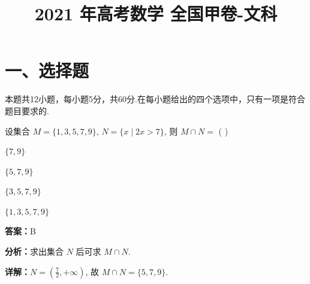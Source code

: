 ﻿\title{2021 年高考数学 全国甲卷-文科}
\date{}
\maketitle

\section*{一、选择题}
本题共12小题，每小题5分，共60分.在每小题给出的四个选项中，只有一项是符合题目要求的.

\begin{question}[points=5]
设集合 $M = \{1,3,5,7,9\}$, $N = \{x \mid 2x > 7\}$, 则 $M \cap N =$ ( )
\begin{choices}
  \item $\{7,9\}$
  \item $\{5,7,9\}$
  \item $\{3,5,7,9\}$
  \item $\{1,3,5,7,9\}$
\end{choices}
\begin{solution}
\textbf{答案：}B

\textbf{分析：}求出集合 $N$ 后可求 $M \cap N$.

\textbf{详解：}$N = \left(\frac{7}{2}, +\infty\right)$, 故 $M \cap N = \{5,7,9\}$.
\end{solution}
\end{question}

